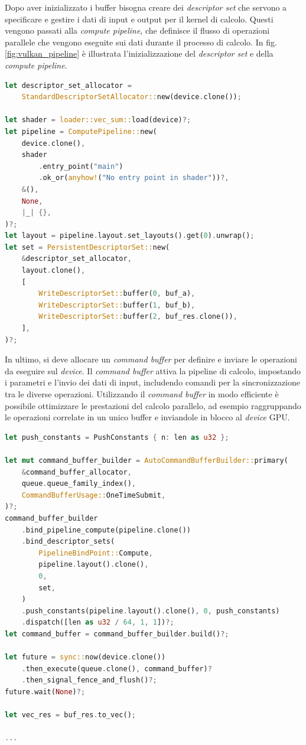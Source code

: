 Dopo aver inizializzato i buffer bisogna creare dei \textit{descriptor set} che servono a specificare e gestire i dati di input e output per il kernel di calcolo. Questi vengono passati alla \textit{compute pipeline}, che definisce il flusso di operazioni parallele che vengono eseguite sui dati durante il processo di calcolo. In  fig. \ref{fig:vulkan_pipeline} è illustrata l'inizializzazione del \textit{descriptor set} e della \textit{compute pipeline}.

\vspace{5mm}
\begin{lstlisting}[language=Rust, caption=Inizializzazione della compute pipeline, label=lis:vulkan_pipeline]
let descriptor_set_allocator =
    StandardDescriptorSetAllocator::new(device.clone());

let shader = loader::vec_sum::load(device)?;
let pipeline = ComputePipeline::new(
    device.clone(),
    shader
        .entry_point("main")
        .ok_or(anyhow!("No entry point in shader"))?,
    &(),
    None,
    |_| {},
)?;
let layout = pipeline.layout.set_layouts().get(0).unwrap();
let set = PersistentDescriptorSet::new(
    &descriptor_set_allocator,
    layout.clone(),
    [
        WriteDescriptorSet::buffer(0, buf_a),
        WriteDescriptorSet::buffer(1, buf_b),
        WriteDescriptorSet::buffer(2, buf_res.clone()),
    ],
)?;
\end{lstlisting}
\vspace{5mm}

In ultimo, si deve allocare un \textit{command buffer} per definire e inviare le operazioni da eseguire sul \textit{device}. Il \textit{command buffer} attiva la pipeline di calcolo, impostando i parametri e l'invio dei dati di input, includendo comandi per la sincronizzazione tra le diverse operazioni. Utilizzando il \textit{command buffer} in modo efficiente è possibile ottimizzare le prestazioni del calcolo parallelo, ad esempio raggruppando le operazioni correlate in un unico buffer e inviandole in blocco al \textit{device} \gls{GPU}.

\newpage
\vspace{5mm}
\begin{lstlisting}[language=Rust, caption=Command buffer e dispatch, label=lis:vulkan_dispatch]
let push_constants = PushConstants { n: len as u32 };

let mut command_buffer_builder = AutoCommandBufferBuilder::primary(
    &command_buffer_allocator,
    queue.queue_family_index(),
    CommandBufferUsage::OneTimeSubmit,
)?;
command_buffer_builder
    .bind_pipeline_compute(pipeline.clone())
    .bind_descriptor_sets(
        PipelineBindPoint::Compute,
        pipeline.layout().clone(),
        0,
        set,
    )
    .push_constants(pipeline.layout().clone(), 0, push_constants)
    .dispatch([len as u32 / 64, 1, 1])?;
let command_buffer = command_buffer_builder.build()?;

let future = sync::now(device.clone())
    .then_execute(queue.clone(), command_buffer)?
    .then_signal_fence_and_flush()?;
future.wait(None)?;

let vec_res = buf_res.to_vec();

...
\end{lstlisting}
\vspace{5mm}

